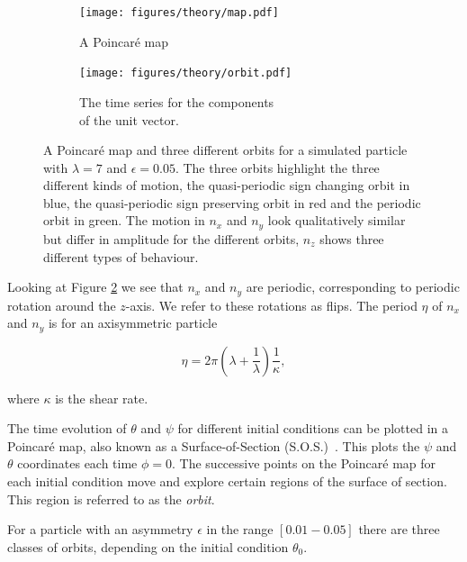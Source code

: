 \begin{figure}[H]
\centering
\begin{subfigure}[b]{0.45\textwidth}
\texttt{[image: figures/theory/map.pdf]}
\caption{A Poincaré map}\label{fig:orbitmap}
\end{subfigure}\hspace{1em}%
\begin{subfigure}[b]{0.5\textwidth}
\texttt{[image: figures/theory/orbit.pdf]}
\caption{The time series for the components \\ of the unit vector.}\label{fig:orbitparams}
\end{subfigure}
\caption{A Poincaré map and three different orbits for a simulated particle with $\lambda=7$ and $\epsilon=0.05$. The three orbits highlight the three different kinds of motion, the quasi-periodic sign changing orbit in blue, the quasi-periodic sign preserving orbit in red and the periodic orbit in green. The motion in $n_x$ and $n_y$ look qualitatively similar but differ in amplitude for the different orbits, $n_z$ shows three different types of behaviour. }
\label{fig:orbittypes}
\end{figure}



Looking at Figure \ref{fig:orbitparams} we see that $n_x$ and $n_y$ are periodic, corresponding to periodic rotation around the $z$-axis. We refer to these rotations as flips. The period $\eta$ of $n_x$ and $n_y$ is for an axisymmetric particle \cite{Jeffery}

\begin{equation}\label{eq:flipRate}
\eta = 2\pi \left( \lambda + \frac{1}{\lambda} \right)\frac{1}{\kappa},
\end{equation}

\noindent where $\kappa$ is the shear rate. 

The time evolution of $\theta$ and $\psi$ for different initial conditions can be plotted in a Poincaré map, also known as a Surface-of-Section (S.O.S.)~\cite{poincare}. This plots the $\psi$ and $\theta$ coordinates each time $\phi = 0$. The successive points on the Poincaré map for each initial condition move and explore certain regions of the surface of section. This region is referred to as the \emph{orbit}. 

For a particle with an asymmetry $\epsilon$ in the range $\left[0.01-0.05\right]$ there are three classes of orbits, depending on the initial condition $\theta_0$.


